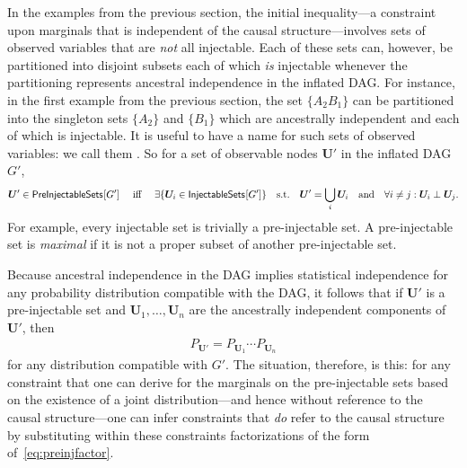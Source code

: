 {In the examples from the previous section, the initial inequality---a constraint upon marginals that is independent of the causal structure---involves sets of observed variables that are \emph{not} all injectable.  Each of these sets can, however, be partitioned into disjoint subsets each of which {\em is} injectable whenever the partitioning represents ancestral independence in the inflated DAG.   For instance, in the first example from the previous section, the set $\{ A_2 B_1\}$ can be partitioned into the singleton sets $\{ A_2 \}$ and $\{ B_1\}$ which are ancestrally independent and each of which is injectable.  It is useful to have a name for such sets of observed variables: we call them . So for a set of observable nodes $\bm{U}'$ in the inflated DAG $G'$,
\begin{align}\label{eq:defpreinj}
\bm{U}'\in{\operatorname{\mathsf{PreInjectableSets}}_{}}\lbrack G'\rbrack \quad\text{ iff }\quad  \exists \{ \bm{U}_i \in {\operatorname{\mathsf{InjectableSets}}_{}}\lbrack G'\rbrack \} \quad \text{s.t.}\quad \bm{U}'=\bigcup_i \bm{U}_i  \quad\text{and} \quad  \forall i\ne j: \bm{U}_i \perp \bm{U}_j.
\end{align}
For example, every injectable set is trivially a pre-injectable set.  A pre-injectable set is \emph{maximal} if it is not a proper subset of another pre-injectable set.

Because ancestral independence in the DAG implies statistical independence for any probability distribution compatible with the DAG, it follows that  if 
$\bm{U}'$ is a pre-injectable set and $\bm{U}_1,\ldots,\bm{U}_n$ are the ancestrally independent components of $\bm{U}'$, then 
\begin{align}\label{eq:preinjfactor}
P_{\bm{U}'} = P_{\bm{U}_1} \cdots P_{\bm{U}_n}
\end{align}
for any distribution compatible with $G'$. The situation, therefore, is this: for any constraint that one can derive for the marginals on the pre-injectable sets based on the existence of a joint distribution---and hence without reference to the causal structure---one can infer constraints that {\em do} refer to the causal structure by substituting within these constraints factorizations of the form of~\cref{eq:preinjfactor}.  

}
